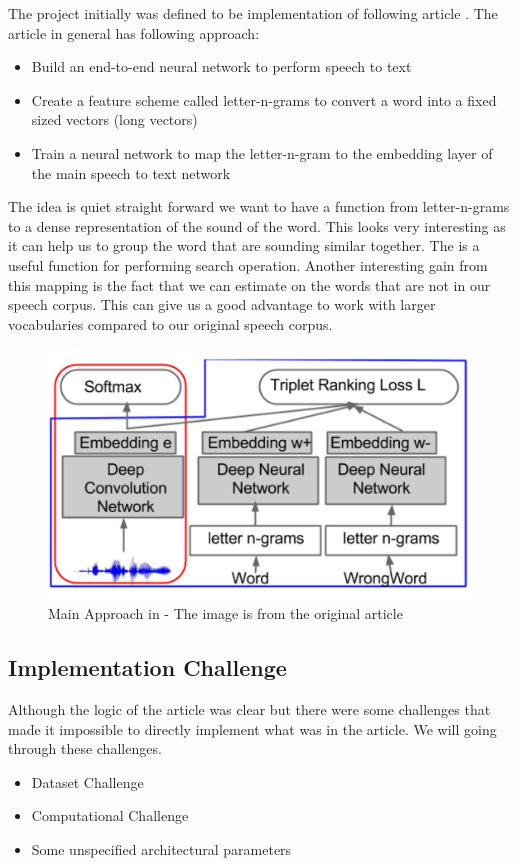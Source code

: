 

The project initially was defined to be implementation of following article \cite{wordembedspeech}. The article in general has following approach: 
\begin{itemize}
    \item Build an end-to-end neural network to perform  speech to text 
    \item Create a feature scheme called letter-n-grams to convert a word into a fixed sized  vectors (long vectors)
    \item Train a neural network to map the letter-n-gram to the embedding layer of the main speech to text network 
\end{itemize}

The idea is quiet straight forward we want to have a function from letter-n-grams to a dense representation of the sound of the word.  This looks very interesting as it can help us to group the word that are sounding similar together. The is a useful function for performing search operation. Another interesting gain from this mapping is the fact that we can estimate on the words that are not in our  speech corpus. This can give us a good advantage to work with larger vocabularies compared to our original speech corpus. 


\begin{figure}[hbt!]
    \centering
    \includegraphics{Images/genera_model.jpg}    
    \caption{Main Approach in \cite{wordembedspeech} - The image is from the original article}
    \label{article_main_approach}
\end{figure}

\subsection{Implementation Challenge}
Although the logic of the article was clear but there were some challenges that made it impossible to directly implement what was in the article. We will going through these challenges. 
\begin{itemize}
    \item Dataset Challenge
    \item Computational Challenge 
    \item Some unspecified architectural parameters 
\end{itemize}

